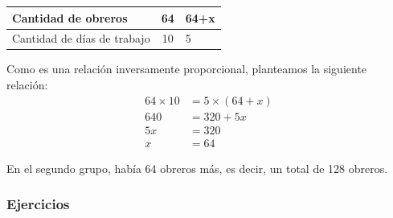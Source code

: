 \documentclass[11pt]{book}
\begin{document}
\begin{table}[H]
  \centering
  \begin{tabular}{|l|c|l|}
    \hline
    Cantidad de obreros         & 64 & 64+x \\
    \hline
    Cantidad de días de trabajo & 10 & 5    \\
    \hline
  \end{tabular}
\end{table}

Como es una relación inversamente proporcional, planteamos la siguiente relación:
\begin{align*}
  64 \times 10 & = 5 \times (64+x) \\
  640          & = 320 +5x         \\
  5x           & = 320             \\
  x            & = 64
\end{align*}

En el segundo grupo, había 64 obreros más, es decir, un total de 128 obreros.





\newpage
\subsubsection{Ejercicios}
\end{document}
